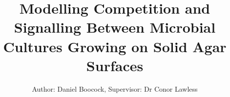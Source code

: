 

\title{Modelling Competition and Signalling Between Microbial Cultures Growing on Solid Agar Surfaces}
\author{Author: Daniel Boocock, Supervisor: Dr Conor Lawless}


\maketitle
\thispagestyle{title}
\noindent\makebox[\linewidth]{\rule{\textwidth}{0.4pt}}

\begin{multicols}{2}








\end{multicols}




